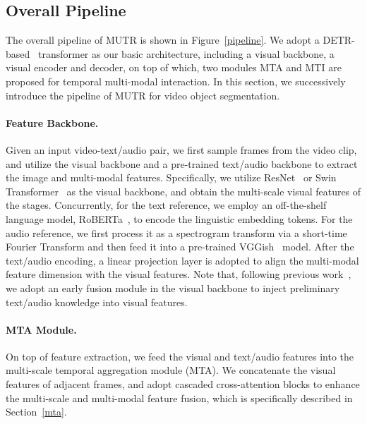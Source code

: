 \documentclass{article}
\begin{document}
\subsection{Overall Pipeline}
\label{overall}
The overall pipeline of MUTR is shown in Figure~\ref{pipeline}. We adopt a DETR-based~\cite{carion2020end} transformer as our basic architecture, including a visual backbone, a visual encoder and decoder, on top of which, two modules MTA and MTI are proposed for temporal multi-modal interaction. In this section, we successively introduce the pipeline of MUTR for video object segmentation.



\paragraph{Feature Backbone.}
Given an input video-text/audio pair, we first sample  frames from the video clip, and utilize the visual backbone and a pre-trained text/audio backbone to extract the image and multi-modal features. Specifically, we utilize ResNet~\cite{he2016deep} or Swin Transformer~\cite{liu2021swin} as the visual backbone, and obtain the multi-scale visual features of the  stages. Concurrently, for the text reference, we employ an off-the-shelf language model, RoBERTa~\cite{liu2019roberta}, to encode the linguistic embedding tokens. For the audio reference, we first process it as a spectrogram transform via a short-time Fourier Transform and then feed it into a pre-trained VGGish~\cite{hershey2017cnn} model. After the text/audio encoding, a linear projection layer is adopted to align the multi-modal feature dimension with the visual features. Note that, following previous work~\cite{wu2022language}, we adopt an early fusion module in the visual backbone to inject preliminary text/audio knowledge into visual features. 

\paragraph{MTA Module.}
On top of feature extraction, we feed the visual and text/audio features into the multi-scale temporal aggregation module (MTA). We concatenate the visual features of adjacent frames, and adopt cascaded cross-attention blocks to enhance the multi-scale and multi-modal feature fusion, which is specifically described in Section~\ref{mta}.
\end{document}
